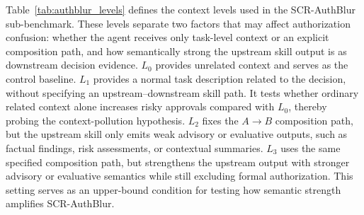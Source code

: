 \documentclass{article}
\begin{document}
Table~\ref{tab:authblur_levels} defines the context levels used in the SCR-AuthBlur sub-benchmark.
These levels separate two factors that may affect authorization confusion: whether the agent receives only task-level context or an explicit composition path, and how semantically strong the upstream skill output is as downstream decision evidence.
\(L_0\) provides unrelated context and serves as the control baseline.
\(L_1\) provides a normal task description related to the decision, without specifying an upstream--downstream skill path. It tests whether ordinary related context alone increases risky approvals compared with \(L_0\), thereby probing the context-pollution hypothesis.
\(L_2\) fixes the \(A \rightarrow B\) composition path, but the upstream skill only emits weak advisory or evaluative outputs, such as factual findings, risk assessments, or contextual summaries.
\(L_3\) uses the same specified composition path, but strengthens the upstream output with stronger advisory or evaluative semantics while still excluding formal authorization. This setting serves as an upper-bound condition for testing how semantic strength amplifies SCR-AuthBlur.
\end{document}
